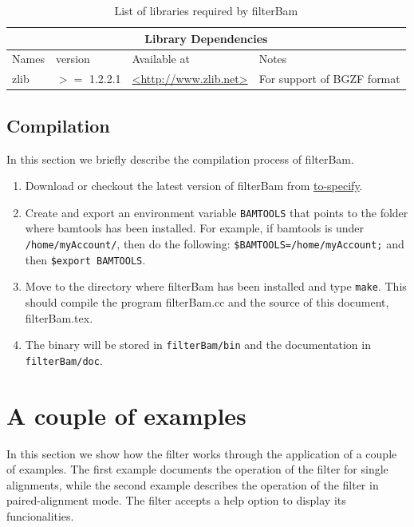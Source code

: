 \documentclass[11pt]{article}
\newcommand{\option}[1]{{\fontfamily{phv}\selectfont#1}}
\newcommand{\software}[1]{{\fontfamily{cmss}\selectfont#1}}
\newcommand{\unix}[1]{\texttt{#1}}
\begin{document}
{\begin{table}
  \begin{center}
    \begin{tabular}{|l|l|l|l|}
	\hline
	\multicolumn{4}{|c|}{Library Dependencies} \\ \cline{1-4}
	\hline
	  Names		&  version  & Available at	&	Notes\\ \cline{1-4}
	  zlib		&  $>=$ 1.2.2.1 & \url{<http://www.zlib.net>} & For support of BGZF format\\ \cline{1-4}
    \end{tabular}
  \end{center}
  \caption{List of libraries required by filterBam}
  \label{tab:libraries}
\end{table}


\subsection{Compilation}

In this section we briefly describe the compilation process of \software{filterBam}. 

\begin{enumerate}
	\item
		Download or checkout the latest version of filterBam from \url{to-specify}. 
	\item
		Create and export an environment variable \unix{BAMTOOLS} that points to the folder where 
		\software{bamtools} has been installed. For example, if \software{bamtools} is under 
		\unix{/home/myAccount/}, then do the following: \unix{\$BAMTOOLS=/home/myAccount;} and then 
		\unix{\$export BAMTOOLS}. 		
	\item
		Move to the directory where filterBam has been installed and type \unix{make}. This should compile 
		the program filterBam.cc and the source of this document, filterBam.tex.
	\item
		The binary will be stored in \unix{filterBam/bin} and the documentation in \unix{filterBam/doc}. 
\end{enumerate}

\section{A couple of examples}
In this section we show how the filter works through the application of a couple of examples. The first 
example documents the operation of the filter for single alignments, while the second example describes 
the operation of the filter in paired-alignment mode. The filter accepts a \option{help} option to 
display its funcionalities.

}
\end{document}
